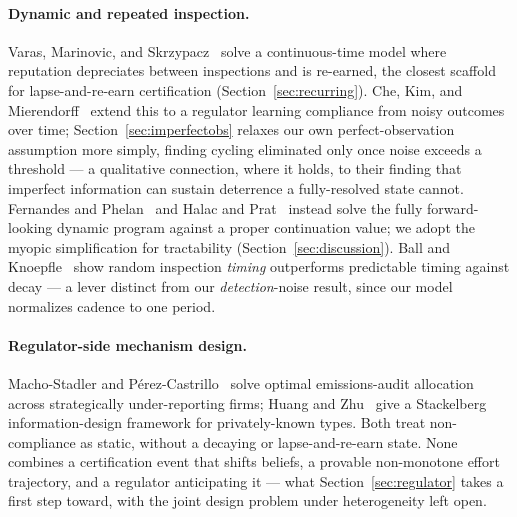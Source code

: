 \paragraph{Dynamic and repeated inspection.} Varas, Marinovic, and Skrzypacz~\cite{varas2020random} solve a continuous-time model where reputation depreciates between inspections and is re-earned, the closest scaffold for lapse-and-re-earn certification (Section~\ref{sec:recurring}). Che, Kim, and Mierendorff~\cite{che2024datadriven} extend this to a regulator learning compliance from noisy outcomes over time; Section~\ref{sec:imperfectobs} relaxes our own perfect-observation assumption more simply, finding cycling eliminated only once noise exceeds a threshold — a qualitative connection, where it holds, to their finding that imperfect information can sustain deterrence a fully-resolved state cannot. Fernandes and Phelan~\cite{fernandes2000recursive} and Halac and Prat~\cite{halac2016managerial} instead solve the fully forward-looking dynamic program against a proper continuation value; we adopt the myopic simplification for tractability (Section~\ref{sec:discussion}). Ball and Knoepfle~\cite{ball2023timing} show random inspection \emph{timing} outperforms predictable timing against decay — a lever distinct from our \emph{detection}-noise result, since our model normalizes cadence to one period.

\paragraph{Regulator-side mechanism design.} Macho-Stadler and P\'{e}rez-Castrillo~\cite{machostadler2006optimal} solve optimal emissions-audit allocation across strategically under-reporting firms; Huang and Zhu~\cite{huang2024zetar} give a Stackelberg information-design framework for privately-known types. Both treat non-compliance as static, without a decaying or lapse-and-re-earn state. None combines a certification event that shifts beliefs, a provable non-monotone effort trajectory, and a regulator anticipating it — what Section~\ref{sec:regulator} takes a first step toward, with the joint design problem under heterogeneity left open.

